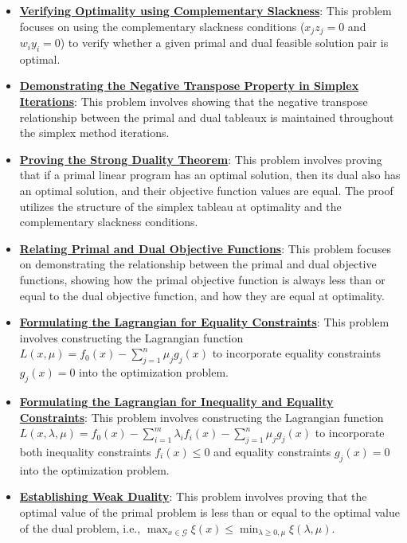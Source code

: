 \documentclass{article}%
\begin{document}
\begin{itemize}[leftmargin=*]%
\item \href{https://www.math.purdue.edu/~yipn/421/2024-09-12-Duality.pdf#page=21}{\textbf{Verifying Optimality using Complementary Slackness}}: This problem focuses on using the complementary slackness conditions ($x_j z_j = 0$ and $w_i y_i = 0$) to verify whether a given primal and dual feasible solution pair is optimal.%
\item \href{https://www.math.purdue.edu/~yipn/421/2024-09-12-Duality.pdf#page=6}{\textbf{Demonstrating the Negative Transpose Property in Simplex Iterations}}: This problem involves showing that the negative transpose relationship between the primal and dual tableaux is maintained throughout the simplex method iterations.%
\item \href{https://www.math.purdue.edu/~yipn/421/2024-09-12-Duality.pdf#page=11}{\textbf{Proving the Strong Duality Theorem}}: This problem involves proving that if a primal linear program has an optimal solution, then its dual also has an optimal solution, and their objective function values are equal. The proof utilizes the structure of the simplex tableau at optimality and the complementary slackness conditions.%
\item \href{https://www.math.purdue.edu/~yipn/421/2024-09-12-Duality.pdf#page=22}{\textbf{Relating Primal and Dual Objective Functions}}: This problem focuses on demonstrating the relationship between the primal and dual objective functions, showing how the primal objective function is always less than or equal to the dual objective function, and how they are equal at optimality.%
\item \href{https://www.math.purdue.edu/~yipn/421/2024-09-17-DualityGeneral.pdf#page=2}{\textbf{Formulating the Lagrangian for Equality Constraints}}: This problem involves constructing the Lagrangian function $L(x, \mu) = f_0(x) - \sum_{j=1}^n \mu_j g_j(x)$ to incorporate equality constraints $g_j(x) = 0$ into the optimization problem.%
\item \href{https://www.math.purdue.edu/~yipn/421/2024-09-17-DualityGeneral.pdf#page=7}{\textbf{Formulating the Lagrangian for Inequality and Equality Constraints}}: This problem involves constructing the Lagrangian function $L(x, \lambda, \mu) = f_0(x) - \sum_{i=1}^m \lambda_i f_i(x) - \sum_{j=1}^n \mu_j g_j(x)$ to incorporate both inequality constraints $f_i(x) \le 0$ and equality constraints $g_j(x) = 0$ into the optimization problem.%
\item \href{https://www.math.purdue.edu/~yipn/421/2024-09-17-DualityGeneral.pdf#page=5}{\textbf{Establishing Weak Duality}}: This problem involves proving that the optimal value of the primal problem is less than or equal to the optimal value of the dual problem, i.e., $\max_{x \in \mathcal{G}} \xi(x) \le \min_{\lambda \ge 0, \mu} \xi(\lambda, \mu)$.%

\end{itemize}
\end{document}
